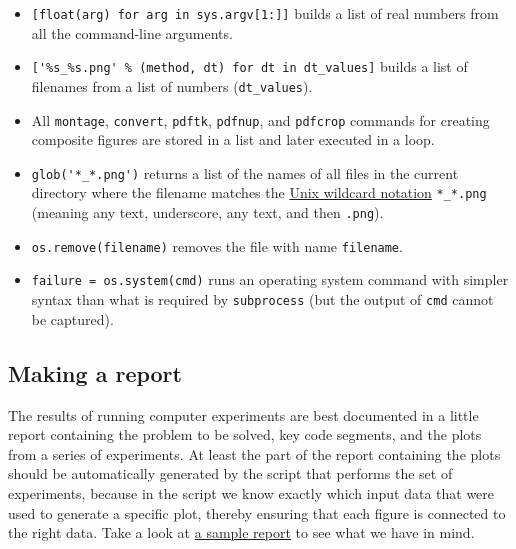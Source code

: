 \documentclass[graybox,sectrefs,envcountresetchap,open=right,final]{svmonodo}
\begin{document}
\begin{itemize}
 \item \texttt{[float(arg) for arg in sys.argv[1:]]} builds a list of real numbers
   from all the command-line arguments.

 \item \Verb!['%
   filenames from a list of numbers (\Verb!dt_values!).

 \item All \texttt{montage}, \texttt{convert}, \texttt{pdftk}, \texttt{pdfnup}, and \texttt{pdfcrop}
   commands for creating
   composite figures are stored in a
   list and later executed in a loop.

 \item \Verb!glob('*_*.png')! returns a list of the names of all files in the
   current directory where the filename matches the \href{{http://en.wikipedia.org/wiki/Glob_(programming)}}{Unix wildcard notation}
   \Verb!*_*.png! (meaning any text, underscore, any text, and then \texttt{.png}).

 \item \texttt{os.remove(filename)} removes the file with name \texttt{filename}.

 \item \texttt{failure = os.system(cmd)} runs an operating system command with
   simpler syntax than what is required by \texttt{subprocess} (but the output
   of \texttt{cmd} cannot be captured).
\end{itemize}

\noindent
\subsection{Making a report}
\label{softeng1:exper:report}

The results of running computer experiments are best documented in a
little report containing the problem to be solved, key code segments,
and the plots from a series of experiments. At least the part of the
report containing the plots should be automatically generated by the
script that performs the set of experiments, because in the script we
know exactly which input data that were used to generate a specific
plot, thereby ensuring that each figure is connected to the
right data. Take a look at \href{{http://tinyurl.com/nc4upel/_static/sphinx-cloud/}}{a sample report}  to see what we have in
mind.

\end{document}
